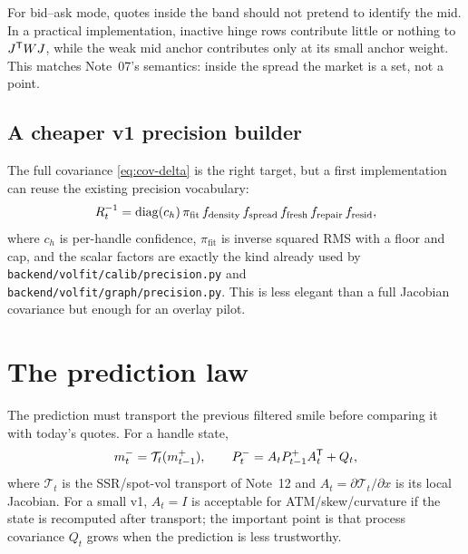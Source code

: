 \documentclass[11pt]{article}
\begin{document}
\begin{remark}
For bid--ask mode, quotes inside the band should not pretend to identify the
mid. In a practical implementation, inactive hinge rows contribute little or
nothing to $J^{\mathsf{T}} WJ$, while the weak mid anchor contributes only at its small
anchor weight. This matches Note~07's semantics: inside the spread the market is
a set, not a point.
\end{remark}

\subsection{A cheaper v1 precision builder}

The full covariance \eqref{eq:cov-delta} is the right target, but a first
implementation can reuse the existing precision vocabulary:
\[
R_t^{-1}
=\operatorname{diag}(c_h)\,
\pi_{\mathrm{fit}}\,
f_{\mathrm{density}}\,
f_{\mathrm{spread}}\,
f_{\mathrm{fresh}}\,
f_{\mathrm{repair}}\,
f_{\mathrm{resid}},
\label{eq:cheapR}
\]
where $c_h$ is per-handle confidence, $\pi_{\mathrm{fit}}$ is inverse squared
RMS with a floor and cap, and the scalar factors are exactly the kind already
used by \nolinkurl{backend/volfit/calib/precision.py} and
\nolinkurl{backend/volfit/graph/precision.py}. This is less elegant than a full
Jacobian covariance but enough for an overlay pilot.

\section{The prediction law}
\label{sec:prediction}

The prediction must transport the previous filtered smile before comparing it
with today's quotes. For a handle state,
\[
m_t^-=\mathcal T_t(m_{t-1}^+),
\qquad
P_t^-=A_tP_{t-1}^+A_t^{\mathsf{T}}+Q_t,
\label{eq:transport}
\]
where $\mathcal T_t$ is the SSR/spot-vol transport of Note~12 and
$A_t=\partial\mathcal T_t/\partial x$ is its local Jacobian. For a small v1,
$A_t=I$ is acceptable for ATM/skew/curvature if the state is recomputed after
transport; the important point is that process covariance $Q_t$ grows when the
prediction is less trustworthy.
\end{document}
